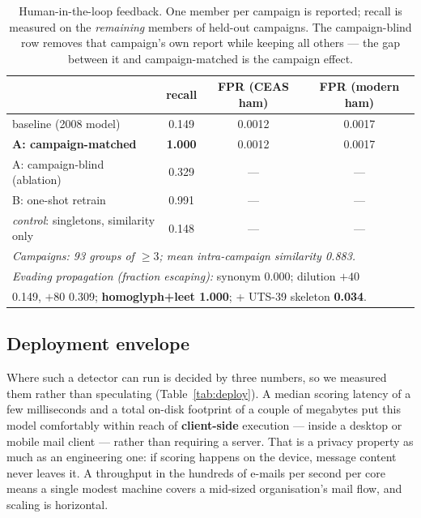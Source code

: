 \documentclass[11pt]{article}
\begin{document}
\begin{table}[t]
\centering
\caption{Human-in-the-loop feedback. One member per campaign is reported; recall is measured on the
\emph{remaining} members of held-out campaigns. The campaign-blind row removes that campaign's own
report while keeping all others --- the gap between it and campaign-matched is the campaign effect.}
\label{tab:feedback}
\begin{tabular}{lccc}
\toprule
 & recall & FPR (CEAS ham) & FPR (modern ham) \\
\midrule
baseline (2008 model)                  & 0.149 & 0.0012 & 0.0017 \\
\textbf{A: campaign-matched}           & \textbf{1.000} & 0.0012 & 0.0017 \\
A: campaign-blind (ablation)           & 0.329 & --- & --- \\
B: one-shot retrain                    & 0.991 & --- & --- \\
\emph{control}: singletons, similarity only & 0.148 & --- & --- \\
\midrule
\multicolumn{4}{l}{\emph{Campaigns: 93 groups of $\ge 3$; mean intra-campaign similarity 0.883.}} \\
\multicolumn{4}{l}{\emph{Evading propagation (fraction escaping):} synonym 0.000; dilution $+40$} \\
\multicolumn{4}{l}{0.149, $+80$ 0.309; \textbf{homoglyph+leet 1.000}; + UTS-39 skeleton \textbf{0.034}.} \\
\bottomrule
\end{tabular}
\end{table}

\subsection{Deployment envelope}
\label{sec:envelope}
Where such a detector can run is decided by three numbers, so we measured them rather than
speculating (Table~\ref{tab:deploy}). A median scoring latency of a few milliseconds and a total
on-disk footprint of a couple of megabytes put this model comfortably within reach of
\textbf{client-side} execution --- inside a desktop or mobile mail client --- rather than requiring a
server. That is a privacy property as much as an engineering one: if scoring happens on the device,
message content never leaves it. A throughput in the hundreds of e-mails per second per core means a
single modest machine covers a mid-sized organisation's mail flow, and scaling is horizontal.
\end{document}
